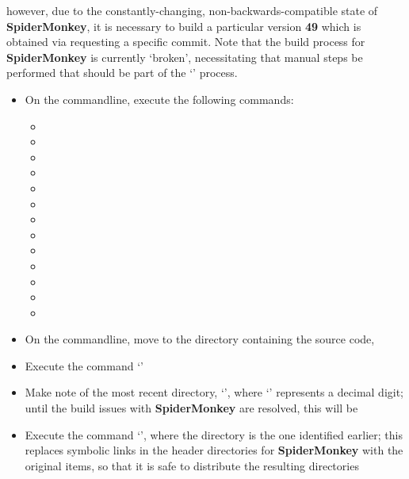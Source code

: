 however, due to the constantly-changing, non-backwards-compatible state of
\textbf{SpiderMonkey}, it is necessary to build a particular version \longDash{}
\textbf{49} \longDash{} which is obtained via requesting a specific  commit.
Note that the build process for \textbf{SpiderMonkey} is currently `broken', necessitating
that manual steps be performed that should be part of the `' process.
\begin{itemize}
\item On the command\longDash{}line, execute the following commands:
\begin{itemize}
\item {}
\item\exSp{}
\item\exSp{}
\item\exSp{}
\item\exSp{}
\item\exSp{}
\item\exSp{}
\item\exSp{}
\item\exSp{}
\item\exSp{}
\item\exSp{}
\item\exSp{}
\item\exSp{}
\end{itemize}
\item\exSp{}On the command\longDash{}line, move to the directory containing the \mplusm{}
source code, 
\item\exSp{}Execute the command `'
\item\exSp{}Make note of the most recent directory, `', where
`\asCode{\#}' represents a decimal digit;
until the build issues with \textbf{SpiderMonkey} are resolved, this will be 
\item\exSp{}Execute the command `', where the directory is the one identified
earlier;
this replaces symbolic links in the header directories for \textbf{SpiderMonkey} with the
original items, so that it is safe to distribute the resulting directories
\end{itemize}
